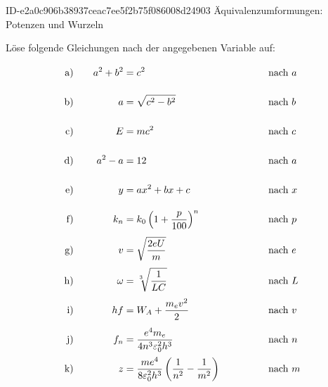 \begin{exercise}
      {ID-e2a0c906b38937ceac7ee5f2b75f086008d24903}
      {Äquivalenzumformungen: Potenzen und Wurzeln}
  \ifproblem\problem\par
    \newcommand{\exnum}[1]{\text{\rule[-2.5ex]{0pt}{6ex}#1}}
    Löse folgende Gleichungen nach der angegebenen Variable auf:
    \allowdisplaybreaks
    \begin{alignat*}{4}
      \exnum{a)}&\quad &  a^{2}+b^{2}&=c^{2}                                                                                & \quad&\quad & \quad&\text{nach $a$}    \\
      \exnum{b)}&\quad &            a&=\sqrt{c^{2}-b^{2}}                                                                   & \quad&\quad & \quad&\text{nach $b$}    \\
      \exnum{c)}&\quad &            E&=mc^{2}                                                                               & \quad&\quad & \quad&\text{nach $c$}    \\
      \exnum{d)}&\quad &      a^{2}-a&=12                                                                                   & \quad&\quad & \quad&\text{nach $a$}    \\
      \exnum{e)}&\quad &            y&=ax^{2}+bx+c                                                                          & \quad&\quad & \quad&\text{nach $x$}    \\
      \exnum{f)}&\quad &        k_{n}&=k_{0}\left(1+\frac{p}{100}\right)^{n}                                                & \quad&\quad & \quad&\text{nach $p$}    \\
      \exnum{g)}&\quad &            v&=\sqrt{\frac{2eU}{m}}                                                                 & \quad&\quad & \quad&\text{nach $e$}    \\
      \exnum{h)}&\quad &       \omega&=\sqrt[3\;\,]{\frac{1}{LC}}                                                           & \quad&\quad & \quad&\text{nach $L$}    \\
      \exnum{i)}&\quad &           hf&=W_{A}+\frac{m_{e}v^{2}}{2}                                                           & \quad&\quad & \quad&\text{nach $v$}    \\
      \exnum{j)}&\quad &        f_{n}&=\frac{e^{4}m_{e}}{4n^{3}\varepsilon_{0}^{2}h^{3}}                                    & \quad&\quad & \quad&\text{nach $n$}    \\
      \exnum{k)}&\quad &            z&=\frac{me^{4}}{8\varepsilon_{0}^{2}h^{3}}\left(\frac{1}{n^{2}}-\frac{1}{m^{2}}\right) & \quad&\quad & \quad&\text{nach $m$}    \\

\end{alignat*}
\end{exercise}
